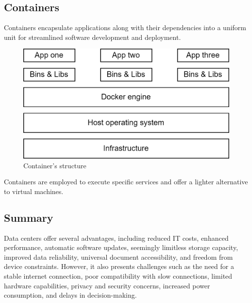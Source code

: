 \subsection{Containers}
Containers encapsulate applications along with their dependencies into a uniform unit for streamlined software development and deployment.
\begin{figure}[H]
    \centering
    \includegraphics[width=0.5\linewidth]{images/container.png}
    \caption{Container's structure}
\end{figure}
Containers are employed to execute specific services and offer a lighter alternative to virtual machines.

\subsection{Summary}
Data centers offer several advantages, including reduced IT costs, enhanced performance, automatic software updates, seemingly limitless storage capacity, improved data reliability, universal document accessibility, and freedom from device constraints. 
However, it also presents challenges such as the need for a stable internet connection, poor compatibility with slow connections, limited hardware capabilities, privacy and security concerns, increased power consumption, and delays in decision-making.